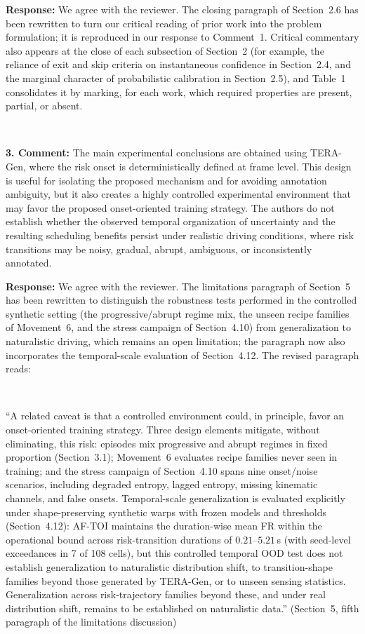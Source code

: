 \documentclass[1p,12pt,authoryear]{elsarticle}
\providecommand{\revcolor}{black}%
\begin{document}
\vspace{2mm}
\noindent \textbf{Response:} We agree with the reviewer. The closing paragraph of Section~2.6 has been rewritten to turn our critical reading of prior work into the problem formulation; it is reproduced in our response to Comment~1. Critical commentary also appears at the close of each subsection of Section~2 (for example, the reliance of exit and skip criteria on instantaneous confidence in Section~2.4, and the marginal character of probabilistic calibration in Section~2.5), and Table~1 consolidates it by marking, for each work, which required properties are present, partial, or absent.

~

\noindent \textbf{3. Comment:} The main experimental conclusions are obtained using TERA-Gen, where the risk onset is deterministically defined at frame level. This design is useful for isolating the proposed mechanism and for avoiding annotation ambiguity, but it also creates a highly controlled experimental environment that may favor the proposed onset-oriented training strategy. The authors do not establish whether the observed temporal organization of uncertainty and the resulting scheduling benefits persist under realistic driving conditions, where risk transitions may be noisy, gradual, abrupt, ambiguous, or inconsistently annotated.

\vspace{2mm}
\noindent \textbf{Response:} We agree with the reviewer. The limitations paragraph of Section~5 has been rewritten to distinguish the robustness tests performed in the controlled synthetic setting (the progressive/abrupt regime mix, the unseen recipe families of Movement~6, and the stress campaign of Section~4.10) from generalization to naturalistic driving, which remains an open limitation; the paragraph now also incorporates the temporal-scale evaluation of Section~4.12. The revised paragraph reads:

~

``A related caveat is that a controlled environment could, in principle, favor an onset-oriented training strategy. Three design elements mitigate, without eliminating, this risk: episodes mix progressive and abrupt regimes in fixed proportion (Section~3.1); Movement~6 evaluates recipe families never seen in training; and the stress campaign of Section~4.10 spans nine onset/noise scenarios, including degraded entropy, lagged entropy, missing kinematic channels, and false onsets. Temporal-scale generalization is evaluated explicitly under shape-preserving synthetic warps with frozen models and thresholds (Section~4.12): AF-TOI maintains the duration-wise mean FR within the operational bound across risk-transition durations of $0.21$--$5.21$\,s (with seed-level exceedances in 7 of 108 cells), but this controlled temporal OOD test does not establish generalization to naturalistic distribution shift, to transition-shape families beyond those generated by TERA-Gen, or to unseen sensing statistics. Generalization across risk-trajectory families beyond these, and under real distribution shift, remains to be established on naturalistic data.'' (Section~5, {\color{\revcolor}fifth} paragraph of the limitations discussion)
\end{document}
